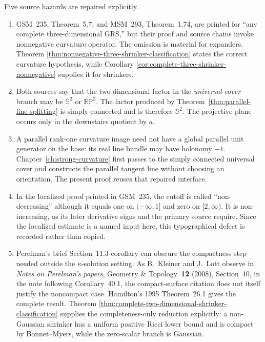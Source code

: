 \documentclass[10pt]{coll-l}
\newcommand{\Sph}{\mathbb{S}}
\theoremstyle{definition}
\theoremstyle{remark}
\numberwithin{section}{chapter}
\numberwithin{equation}{chapter}
\begin{document}
Five source hazards are repaired explicitly.
\begin{enumerate}
\item GSM~235, Theorem~5.7, and MSM~293, Theorem~1.74, are printed for
      ``any complete three-dimensional GRS,'' but their proof and source
      chains invoke nonnegative curvature operator.  The omission is
      material for expanders.  Theorem
      \ref{thm:nonnegative-three-shrinker-classification} states the correct
      curvature hypothesis, while Corollary
      \ref{cor:complete-three-shrinker-nonnegative} supplies it for
      shrinkers.
\item Both sources say that the two-dimensional factor in the
      \emph{universal-cover} branch may be $\Sph^2$ or
      $\mathbb{RP}^2$.  The factor produced by
      Theorem~\ref{thm:parallel-line-splitting} is simply connected and is
      therefore $\Sph^2$.  The projective plane occurs only in the
      downstairs quotient by $a$.
\item A parallel rank-one curvature image need not have a global parallel
      unit generator on the base: its real line bundle may have holonomy
      $-1$.  Chapter~\ref{ch:strong-curvature} first passes to the simply
      connected universal cover and constructs the parallel tangent line
      without choosing an orientation.  The present proof reuses that
      repaired interface.
\item In the localized proof printed in GSM~235, the cutoff is called
      ``non-decreasing'' although it equals one on $(-\infty,1]$ and zero on
      $[2,\infty)$.  It is non-increasing, as its later derivative signs and
      the primary source require.  Since the localized estimate is a named
      input here, this typographical defect is recorded rather than copied.
\item Perelman's brief Section~11.3 corollary can obscure the compactness
      step needed outside the $\kappa$-solution setting.  As B.~Kleiner and
      J.~Lott observe in \emph{Notes on Perelman's papers}, Geometry \&
      Topology~\textbf{12} (2008), Section~40, in the note following
      Corollary~40.1, the compact-surface citation does not itself justify
      the noncompact case.  Hamilton's 1995 Theorem~26.1 gives the complete
      result.  Theorem
      \ref{thm:complete-two-dimensional-shrinker-classification} supplies
      the completeness-only reduction explicitly: a non-Gaussian shrinker
      has a uniform positive Ricci lower bound and is compact by
      Bonnet--Myers, while the zero-scalar branch is Gaussian.
\end{enumerate}
\end{document}
